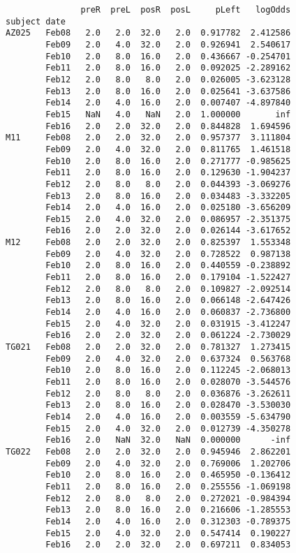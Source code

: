 \documentclass[11pt]{article}
\begin{document}
    
    \begin{verbatim}
               preR  preL  posR  posL     pLeft   logOdds
subject date                                             
AZ025   Feb08   2.0   2.0  32.0   2.0  0.917782  2.412586
        Feb09   2.0   4.0  32.0   2.0  0.926941  2.540617
        Feb10   2.0   8.0  16.0   2.0  0.436667 -0.254701
        Feb11   2.0   8.0  16.0   2.0  0.092025 -2.289162
        Feb12   2.0   8.0   8.0   2.0  0.026005 -3.623128
        Feb13   2.0   8.0  16.0   2.0  0.025641 -3.637586
        Feb14   2.0   4.0  16.0   2.0  0.007407 -4.897840
        Feb15   NaN   4.0   NaN   2.0  1.000000       inf
        Feb16   2.0   2.0  32.0   2.0  0.844828  1.694596
M11     Feb08   2.0   2.0  32.0   2.0  0.957377  3.111804
        Feb09   2.0   4.0  32.0   2.0  0.811765  1.461518
        Feb10   2.0   8.0  16.0   2.0  0.271777 -0.985625
        Feb11   2.0   8.0  16.0   2.0  0.129630 -1.904237
        Feb12   2.0   8.0   8.0   2.0  0.044393 -3.069276
        Feb13   2.0   8.0  16.0   2.0  0.034483 -3.332205
        Feb14   2.0   4.0  16.0   2.0  0.025180 -3.656209
        Feb15   2.0   4.0  32.0   2.0  0.086957 -2.351375
        Feb16   2.0   2.0  32.0   2.0  0.026144 -3.617652
M12     Feb08   2.0   2.0  32.0   2.0  0.825397  1.553348
        Feb09   2.0   4.0  32.0   2.0  0.728522  0.987138
        Feb10   2.0   8.0  16.0   2.0  0.440559 -0.238892
        Feb11   2.0   8.0  16.0   2.0  0.179104 -1.522427
        Feb12   2.0   8.0   8.0   2.0  0.109827 -2.092514
        Feb13   2.0   8.0  16.0   2.0  0.066148 -2.647426
        Feb14   2.0   4.0  16.0   2.0  0.060837 -2.736800
        Feb15   2.0   4.0  32.0   2.0  0.031915 -3.412247
        Feb16   2.0   2.0  32.0   2.0  0.061224 -2.730029
TG021   Feb08   2.0   2.0  32.0   2.0  0.781327  1.273415
        Feb09   2.0   4.0  32.0   2.0  0.637324  0.563768
        Feb10   2.0   8.0  16.0   2.0  0.112245 -2.068013
        Feb11   2.0   8.0  16.0   2.0  0.028070 -3.544576
        Feb12   2.0   8.0   8.0   2.0  0.036876 -3.262611
        Feb13   2.0   8.0  16.0   2.0  0.028470 -3.530030
        Feb14   2.0   4.0  16.0   2.0  0.003559 -5.634790
        Feb15   2.0   4.0  32.0   2.0  0.012739 -4.350278
        Feb16   2.0   NaN  32.0   NaN  0.000000      -inf
TG022   Feb08   2.0   2.0  32.0   2.0  0.945946  2.862201
        Feb09   2.0   4.0  32.0   2.0  0.769006  1.202706
        Feb10   2.0   8.0  16.0   2.0  0.465950 -0.136412
        Feb11   2.0   8.0  16.0   2.0  0.255556 -1.069198
        Feb12   2.0   8.0   8.0   2.0  0.272021 -0.984394
        Feb13   2.0   8.0  16.0   2.0  0.216606 -1.285553
        Feb14   2.0   4.0  16.0   2.0  0.312303 -0.789375
        Feb15   2.0   4.0  32.0   2.0  0.547414  0.190227
        Feb16   2.0   2.0  32.0   2.0  0.697211  0.834053
    \end{verbatim}
\end{document}

